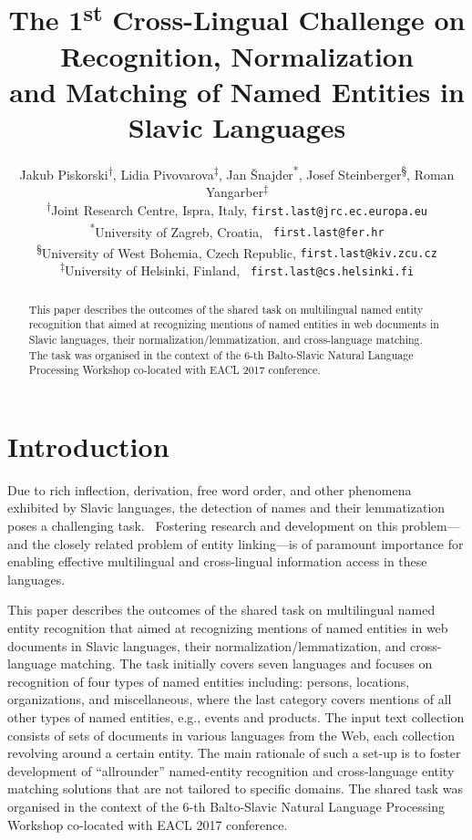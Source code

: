 \documentclass[11pt]{article}
\title{The 1\textsuperscript{st} Cross-Lingual Challenge on Recognition,
  Normalization 
  \\ and Matching of Named Entities in Slavic Languages}
\author{Jakub Piskorski\textsuperscript{$\dagger$},
  Lidia Pivovarova\textsuperscript{$\ddagger$},
  Jan Šnajder\textsuperscript{*},
  Josef Steinberger\textsuperscript{\S},
  Roman Yangarber\textsuperscript{$\ddagger$} \\
  \textsuperscript{$\dagger$}Joint Research Centre,
  \comment{Via Enrico Fermi 2749, 21027}Ispra\comment{ (VA)}, Italy,
  {\small \tt first.last@jrc.ec.europa.eu} \\
  \textsuperscript{*}University of Zagreb, Croatia, {\small \tt
    first.last@fer.hr} \\
  \textsuperscript{\S}University of West Bohemia, Czech Republic, 
  {\small \tt first.last@kiv.zcu.cz} \\
  \textsuperscript{$\ddagger$}University of Helsinki, Finland, {\small \tt
    first.last@cs.helsinki.fi}
  }
\date{}
\begin{document}
\maketitle
\begin{abstract}
This paper describes the outcomes of the shared task on multilingual named entity recognition 
that aimed at recognizing mentions of named entities in web documents in Slavic languages, 
their normalization/lemmatization, and cross-language matching. The task was organised in 
the context of the 6-th Balto-Slavic Natural Language Processing Workshop co-located with 
EACL 2017 conference. 
\end{abstract}

\section{Introduction}
\label{sec:intro}

Due to rich inflection, derivation, free word order, and other phenomena
exhibited by Slavic languages, the detection of names and their
lemmatization poses a challenging task.~\cite{Przepiorkowski:2007:SIE:1567545.1567547,journals/ir/PiskorskiWS09} 
Fostering research and development on this problem---and the closely related problem of entity
linking---is of paramount importance for enabling effective multilingual
and cross-lingual information access in these languages.

This paper describes the outcomes of the shared task on multilingual named 
entity recognition that aimed at recognizing mentions of named entities in web documents 
in Slavic languages, their normalization/lemmatization, and cross-language matching.
The task initially covers seven languages and focuses on recognition of four types of 
named entities including: persons, locations, organizations, and miscellaneous,
where the last category covers mentions of all other types of named entities, e.g., events and products.
The input text collection consists of sets of documents in various languages from the 
Web, each collection revolving around a certain entity. The main rationale of such a 
set-up is to foster development of ``allrounder'' named-entity recognition and 
cross-language entity matching solutions that are not tailored to specific domains.
The shared task was organised in the context of the 6-th Balto-Slavic Natural Language Processing 
Workshop co-located with EACL 2017 conference. 
\end{document}
